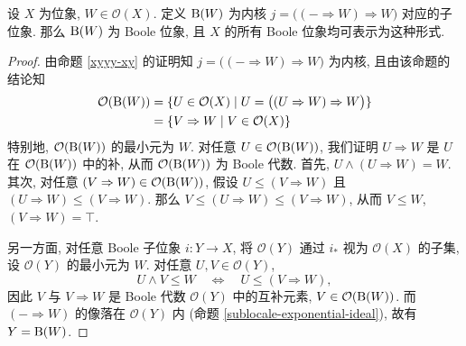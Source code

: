 
\begin{propdef}
	[label={Boolean-sublocale}]
	{}
	设 $X$ 为位象, $W\in\mathcal O(X)$.
	定义 $\text{B}(W)$ 为内核 $j = \big((-\Rightarrow W) \Rightarrow W\big)$ 对应的子位象.
	那么 $\text{B}(W)$ 为 Boole 位象, 且 $X$ 的所有 Boole 位象均可表示为这种形式.
\end{propdef}
\begin{proof}
	由命题 \ref{xyyy-xy} 的证明知 $j = \big((-\Rightarrow W) \Rightarrow W\big)$ 为内核,
	且由该命题的结论知
	$$
	\begin{aligned}
		\mathcal O(\text{B}(W)) &= \{U\in\mathcal O(X) \mid U=\big((U\Rightarrow W)\Rightarrow W\big)\}\\
		&= \{V\Rightarrow W \mid V\in\mathcal O(X)\}
	\end{aligned}
	$$
	特别地, $\mathcal O(\text{B}(W))$ 的最小元为 $W$.
	对任意 $U\in \mathcal O(\text{B}(W))$,
	我们证明 $U\Rightarrow W$ 是 $U$ 在 $\mathcal O(\text{B}(W))$ 中的补, 从而 $\mathcal O(\text{B}(W))$ 为 Boole 代数.
	首先, $U\land (U\Rightarrow W) = W$.
	其次, 对任意 $(V\Rightarrow W)\in \mathcal O(\text{B}(W))$,
	假设 $U\leq (V\Rightarrow W)$ 且 $(U\Rightarrow W) \leq (V\Rightarrow W)$.
	那么 $V\leq (U\Rightarrow W) \leq (V\Rightarrow W)$, 从而 $V\leq W$, $(V\Rightarrow W) = \top$.
	
	另一方面, 对任意 Boole 子位象 $i\colon Y\to X$, 将 $\mathcal O(Y)$ 通过 $i_*$ 视为 $\mathcal O(X)$ 的子集,
	设 $\mathcal O(Y)$ 的最小元为 $W$. 对任意 $U,V\in \mathcal O(Y)$,
	\[
	U\land V\leq W \quad\Leftrightarrow \quad U\leq (V\Rightarrow W),
	\]
	因此 $V$ 与 $V\Rightarrow W$ 是 Boole 代数 $\mathcal O(Y)$ 中的互补元素, $V\in\mathcal O(\text{B}(W))$.
	而 $(-\Rightarrow W)$ 的像落在 $\mathcal O(Y)$ 内 (命题 \ref{sublocale-exponential-ideal}),
	故有 $Y = \text{B}(W)$.
\end{proof}
